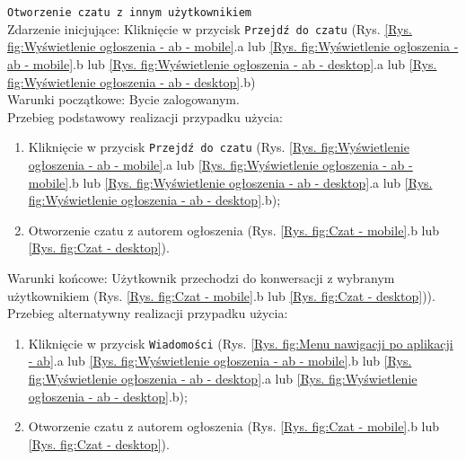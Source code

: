 \texttt{Otworzenie czatu z innym użytkownikiem} \\
\label{Otworzenie czatu z innym uzytkownikiem}
Zdarzenie inicjujące: Kliknięcie w przycisk \texttt{Przejdź do czatu} (Rys. \ref{Rys. fig:Wyświetlenie ogłoszenia - ab - mobile}.a lub \ref{Rys. fig:Wyświetlenie ogłoszenia - ab - mobile}.b lub \ref{Rys. fig:Wyświetlenie ogłoszenia - ab - desktop}.a lub \ref{Rys. fig:Wyświetlenie ogłoszenia - ab - desktop}.b) \\
Warunki początkowe: Bycie zalogowanym. \\
Przebieg podstawowy realizacji przypadku użycia:
\begin{enumerate}
    \item Kliknięcie w przycisk \texttt{Przejdź do czatu} (Rys. \ref{Rys. fig:Wyświetlenie ogłoszenia - ab - mobile}.a lub \ref{Rys. fig:Wyświetlenie ogłoszenia - ab - mobile}.b lub \ref{Rys. fig:Wyświetlenie ogłoszenia - ab - desktop}.a lub \ref{Rys. fig:Wyświetlenie ogłoszenia - ab - desktop}.b);
    \item Otworzenie czatu z autorem ogłoszenia (Rys. \ref{Rys. fig:Czat - mobile}.b lub \ref{Rys. fig:Czat - desktop}).
\end{enumerate}
Warunki końcowe: Użytkownik przechodzi do konwersacji z wybranym użytkownikiem (Rys. \ref{Rys. fig:Czat - mobile}.b lub \ref{Rys. fig:Czat - desktop})).\\
Przebieg alternatywny realizacji przypadku użycia: \begin{enumerate}
    \item Kliknięcie w przycisk \texttt{Wiadomości} (Rys. \ref{Rys. fig:Menu nawigacji po aplikacji - ab}.a lub \ref{Rys. fig:Wyświetlenie ogłoszenia - ab - mobile}.b lub \ref{Rys. fig:Wyświetlenie ogłoszenia - ab - desktop}.a lub \ref{Rys. fig:Wyświetlenie ogłoszenia - ab - desktop}.b);
    \item Otworzenie czatu z autorem ogłoszenia (Rys. \ref{Rys. fig:Czat - mobile}.b lub \ref{Rys. fig:Czat - desktop}).
\end{enumerate}
